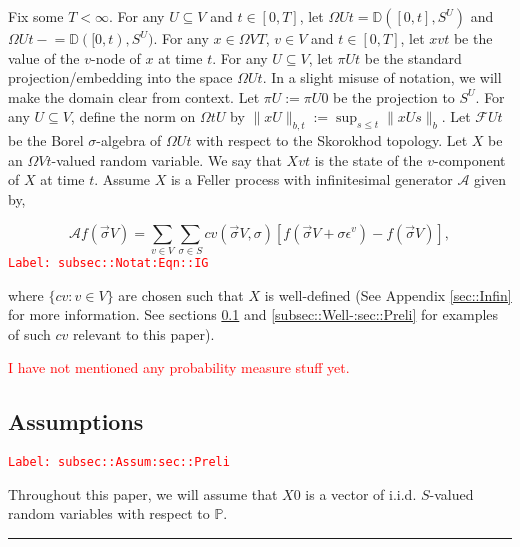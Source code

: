 \documentclass[12pt]{article}
\newcommand{\mb}{\mathbb}
\newcommand{\mc}{\mathcal}
\newcommand{\ep}{\epsilon}
\newcommand{\tr}{\textcolor{red}}
\newcommand{\labe}[1]{\tr{\texttt{Label: #1}}}
\newcommand{\ind}{\hspace{24pt}}
\newcommand{\lin}{\rule{\linewidth}{0.4 pt}}
\newcommand{\pr}{\mb{P}}							%
\newcommand{\defeq}{:=}								%
\newcommand{\cad}{\mb{D}}							%
\renewcommand{\v}{v}							%
\renewcommand{\U}{U}							%
\renewcommand{\S}{S}							%
\newcommand{\s}{\sigma}							%
\newcommand{\sv}{\vec{\s}}						%
\renewcommand{\b}{b}							%
\newcommand{\ev}[1]{\ep^{#1}}					%
\newcommand{\T}{T}								%
\newcommand{\x}{x}								%
\renewcommand{\t}{t}							%
\newcommand{\proj}{\pi}							%
\renewcommand{\tt}{s}							%
\newcommand{\F}{\mc{F}}							%
\newcommand{\X}{X}								%
\newcommand{\IG}{\mc{A}}						%
\newcommand{\IGr}{c}							%
\newcommand{\XState}[1]{\S^{#1}}				%
\begin{document}
\ind Fix some \(\T < \infty\). For any \(\U\subseteq  V\) and \(\t\in [0,\T]\), let \(\Omega{\U}{\t} = \cad([0,\t],\S^{\U})\) and \(\Omega{\U}{\t-} = \cad([0,\t),\S^\U)\). For any \(\x{}{} \in \Omega{ V}{\T}\), \(\v\in  V\) and  \(\t \in [0,\T]\), let \(\x{\v}{\t}\) be the value of the \(\v\)-node of \(\x{}{}\) at time \(\t\). For any \(\U\subseteq  V\), let \(\proj{\U}{\t}\) be the standard projection/embedding into the space \(\Omega{\U}{\t}\). In a slight misuse of notation, we will make the domain clear from context. Let \(\proj{\U}{} \defeq \proj{\U}{0}\) be the projection to \(\S^\U\). For any \(\U\subseteq  V\), define the norm on \(\Omega{\t}{\U}\) by \(\|\x{\U}{}\|_{\b{},\t} \defeq \sup_{\tt \leq \t} \|\x{\U}{\tt}\|_{\b{}}\). Let \(\F{\U}{\t}\) be the Borel \(\sigma\)-algebra of \(\Omega{\U}{\t}\) with respect to the Skorokhod topology. Let \(\X{}{}\) be an \(\Omega{ V}{\t}\)-valued random variable. We say that \(\X{\v}{\t}\) is the state of the \(\v\)-component of \(\X{}{}\) at time \(\t\). Assume \(\X{}{}\) is a Feller process with infinitesimal generator \(\IG\) given by,

\begin{equation}
\IG f(\sv{}{ V}) = \sum_{\v \in  V}\sum_{\s \in \S} \IGr{\v}(\sv{}{ V},\s)[f(\sv{}{ V} + \s \ev{\v}) - f(\sv{}{ V})],
\label{subsec::Notat:Eqn::IG}
\end{equation}
\labe{subsec::Notat:Eqn::IG}

where \(\{\IGr{\v}:\v\in  V\}\) are chosen such that \(\X{}{}\) is well-defined (See Appendix \ref{sec::Infin} for more information. See sections \ref{subsec::Assum:sec::Preli} and \ref{subsec::Well-:sec::Preli} for examples of such \(\IGr{\v}\) relevant to this paper). 

\tr{I have not mentioned any probability measure stuff yet.}

\subsection{Assumptions}
\label{subsec::Assum:sec::Preli}\labe{subsec::Assum:sec::Preli}

Throughout this paper, we will assume that \(\X{}{0}\) is a vector of i.i.d. \(\S\)-valued random variables with respect to \(\pr\).

\lin
\end{document}
